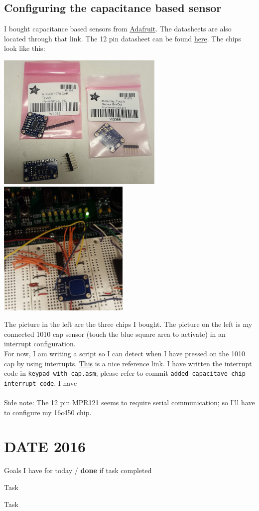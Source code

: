 \documentclass[12pt,twoside]{article}
\newenvironment{tight_itemize}{
\begin{itemize}
  \setlength{\itemsep}{0pt}
  \setlength{\parskip}{0pt}
}{\end{itemize}}
\begin{document}
\subsection{Configuring the capacitance based sensor}
I bought capacitance based sensors from \href{https://learn.adafruit.com/adafruit-capacitive-touch-sensor-breakouts/overview}{Adafruit}. The datasheets are also located through that link. The 12 pin datasheet can be found \href{https://www.sparkfun.com/products/9695}{here}. The chips look like this:
\begin{center}
\includegraphics[width = 80mm]{Pics/5-6a.jpg}
\includegraphics[width = 63mm]{Pics/5-6b.jpg}
\end{center}
The picture in the left are the three chips I bought. The picture on the left is my connected 1010 cap sensor (touch the blue square area to activate) in an interrupt configuration. 
\\ For now, I am writing a script so I can detect when I have pressed on the 1010 cap by using interrupts. \href{http://www.circuitstoday.com/external-interrupts-handling-in-8051}{This} is a nice reference link. I have written the interrupt code in \texttt{keypad\_with\_cap.asm}; please refer to commit \texttt{added capacitave chip interrupt code}. I have 
\\
\\ Side note: The 12 pin MPR121 seems to require serial communication; so I'll have to configure my 16c450 chip. 


\newpage
\section{DATE 2016}

Goals I have for today / {\bf done} if task completed
\begin{tight_itemize}
\item Task %
\item Task 
\end{tight_itemize}
\end{document}
